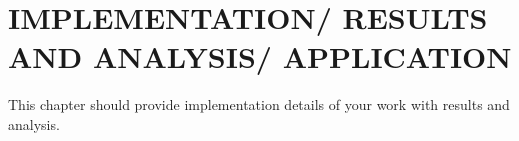 
\chapter{\uppercase{Implementation/ Results and Analysis/ Application}} %
\label{chap5} %
This chapter should provide implementation details of your work with results and analysis. 